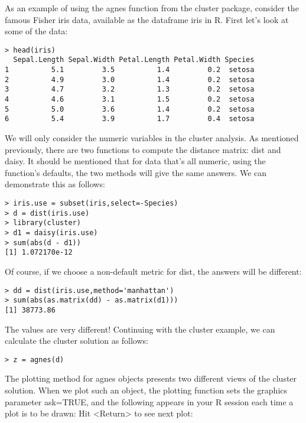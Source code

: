 {As an example of using the agnes function from the cluster package, consider the famous Fisher iris data, available as the dataframe iris in R. First let's look at some of the data:
\begin{framed}
\begin{verbatim}
> head(iris)
  Sepal.Length Sepal.Width Petal.Length Petal.Width Species
1          5.1         3.5          1.4         0.2  setosa
2          4.9         3.0          1.4         0.2  setosa
3          4.7         3.2          1.3         0.2  setosa
4          4.6         3.1          1.5         0.2  setosa
5          5.0         3.6          1.4         0.2  setosa
6          5.4         3.9          1.7         0.4  setosa
\end{verbatim}
\end{framed}
We will only consider the numeric variables in the cluster analysis. As mentioned previously, there are two functions to compute the distance matrix: dist and daisy. It should be mentioned that for data that's all numeric, using the function's defaults, the two methods will give the same answers. We can demonstrate this as follows:
\begin{framed}
\begin{verbatim}
> iris.use = subset(iris,select=-Species)
> d = dist(iris.use)
> library(cluster)
> d1 = daisy(iris.use)
> sum(abs(d - d1))
[1] 1.072170e-12
\end{verbatim}
\end{framed}
Of course, if we choose a non-default metric for dist, the answers will be different:
\begin{framed}
\begin{verbatim}
> dd = dist(iris.use,method='manhattan')
> sum(abs(as.matrix(dd) - as.matrix(d1)))
[1] 38773.86
\end{verbatim}
\end{framed}
The values are very different!
Continuing with the cluster example, we can calculate the cluster solution as follows:
\begin{framed}
\begin{verbatim}
> z = agnes(d)
\end{verbatim}
\end{framed}
The plotting method for agnes objects presents two different views of the cluster solution. When we plot such an object, the plotting function sets the graphics parameter ask=TRUE, and the following appears in your R session each time a plot is to be drawn:
Hit <Return> to see next plot: 

}
